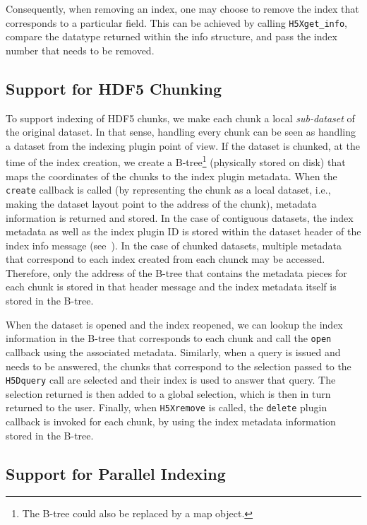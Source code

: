 Consequently, when removing an index, one may choose to remove the index that
corresponds to a particular field. This can be achieved by calling \texttt{H5Xget\_info},
compare the datatype returned within the info structure, and pass the index number
that needs to be removed.

\subsection{Support for HDF5 Chunking}

To support indexing of HDF5 chunks, we make each chunk a local \textit{sub-dataset}
of the original dataset. In that sense, handling every chunk can be seen as handling
a dataset from the indexing plugin point of view. If the dataset is chunked,
at the time of the index creation, we create a B-tree\footnote{The B-tree could also
be replaced by a map object.} (physically
stored on disk) that maps the coordinates of the chunks to the index plugin metadata.
When the \texttt{create} callback is called (by representing the chunk as
a local dataset, i.e., making the dataset layout point to the address of the chunk),
metadata information is returned and stored.
In the case of contiguous datasets, the index metadata as well as the index plugin ID is
stored within the dataset header of the index info message (see~).
In the case of chunked datasets, multiple metadata that correspond to each index created
from each chunck may be accessed. Therefore, only the address of the B-tree that contains the 
metadata pieces for each chunk is stored in that header message and the index
metadata itself is stored in the B-tree.

When the dataset is opened and the index reopened, we can lookup the index
information in the B-tree that corresponds to each chunk and call the \texttt{open}
callback using the associated metadata.
Similarly, when a query is issued and needs to be answered, the chunks that
correspond to the selection passed to the \texttt{H5Dquery} call are selected
and their index is used to answer that query. The selection returned is then
added to a global selection, which is then in turn returned to the user.
Finally, when \texttt{H5Xremove} is called, the \texttt{delete} plugin callback is
invoked for each chunk, by using the index metadata information stored in the B-tree.

\subsection{Support for Parallel Indexing}

